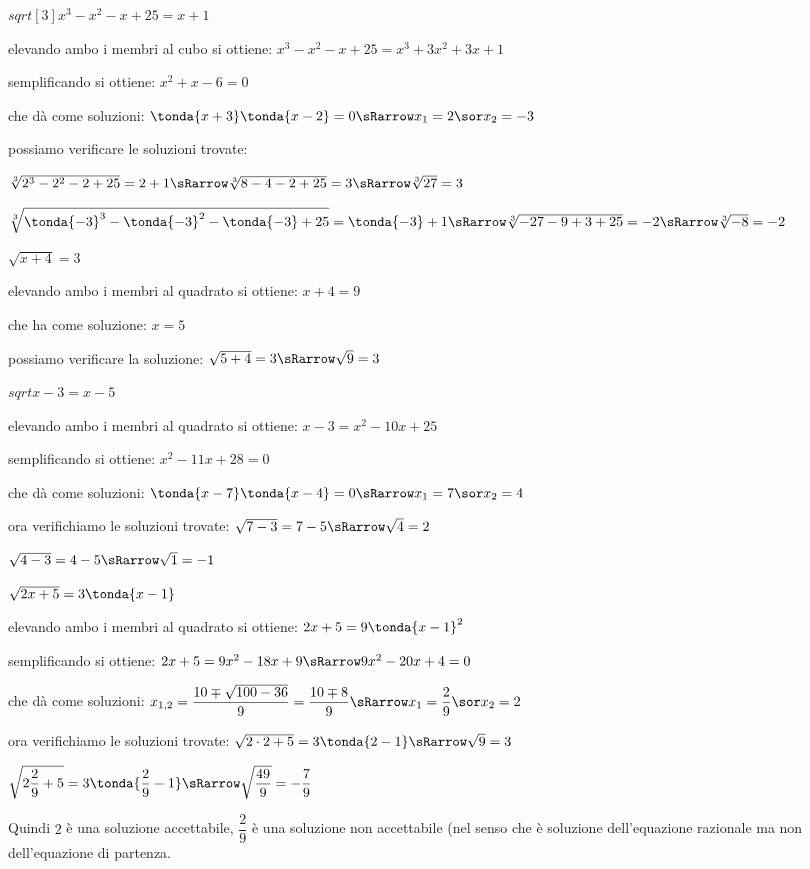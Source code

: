 \begin{esempio}
 \(sqrt[3]{x^3-x^2-x+25} = x+1\)
 
 elevando ambo i membri al cubo si ottiene: \(x^3-x^2-x+25 = x^3+3x^2+3x+1\)
 
 semplificando si ottiene: 
 \(x^2+x-6=0\) 
 
 che dà come soluzioni:
 \(\tonda{x+3}\tonda{x-2}=0 \sRarrow x_1 = 2 \sor x_2=-3\)
 
 possiamo verificare le soluzioni trovate:
 
 \(\sqrt[3]{2^3-2^2-2+25} = 2+1 \sRarrow \sqrt[3]{8-4-2+25} = 3 \sRarrow 
 \sqrt[3]{27} = 3\)
 
 \(\sqrt[3]{\tonda{-3}^3-\tonda{-3}^2-\tonda{-3}+25} = \tonda{-3}+1 \sRarrow 
 \sqrt[3]{-27-9+3+25} = -2 \sRarrow \sqrt[3]{-8} = -2\)
\end{esempio}

\begin{esempio}
 \(\sqrt{x+4} = 3\)
 
 elevando ambo i membri al quadrato si ottiene: \(x+4 = 9\)
 
 che ha come soluzione: \(x=5\)
 
 possiamo verificare la soluzione:
 \(\sqrt{5+4} = 3 \sRarrow \sqrt{9} = 3\)
\end{esempio}

\begin{esempio}
 \(sqrt{x-3} = x-5\)
 
 elevando ambo i membri al quadrato si ottiene: \(x-3 = x^2-10x+25\)
 
 semplificando si ottiene: \(x^2-11x+28=0\)
 
 che dà come soluzioni:
 \(\tonda{x-7}\tonda{x-4}=0 \sRarrow x_1 = 7 \sor x_2 = 4\)
 
 ora verifichiamo le soluzioni trovate:
 \(\sqrt{7-3} = 7-5 \sRarrow \sqrt{4} = 2\)
 
 \(\sqrt{4-3} = 4-5 \sRarrow \sqrt{1} = -1\)
\end{esempio}

\begin{esempio}
 \(\sqrt{2x+5} = 3 \tonda{x-1}\)
 
 elevando ambo i membri al quadrato si ottiene: \(2x+5 = 9\tonda{x-1}^2\)
 
 semplificando si ottiene: \(2x+5 = 9x^2-18x+9 \sRarrow 9x^2-20x+4=0\)
 
 che dà come soluzioni:
 \(x_{1,2} = \dfrac{10 \mp \sqrt{100-36}}{9} = \dfrac{10 \mp 8}{9} \sRarrow 
 x_1 = \dfrac{2}{9} \sor x_2 = 2\)
 
 ora verifichiamo le soluzioni trovate:
 \(\sqrt{2\cdot 2+5} = 3 \tonda{2-1} \sRarrow \sqrt{9} = 3\) 
 
 \(\sqrt{2\dfrac{2}{9}+5} = 3 \tonda{\dfrac{2}{9}-1} \sRarrow 
   \sqrt{\dfrac{49}{9}} = -\dfrac{7}{9}\)
 
 Quindi \(2\) è una soluzione accettabile, 
 \(\dfrac{2}{9}\) è una soluzione non accettabile (nel senso che è soluzione 
dell'equazione razionale ma non dell'equazione di partenza.
\end{esempio}

